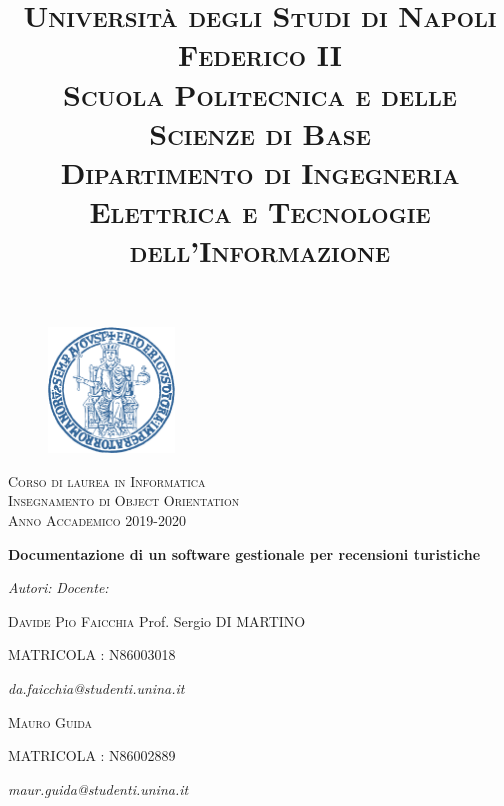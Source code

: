 \documentclass[a4paper,12pt]{article}
\begin{document}
\title { \large \textsc{Università degli Studi di Napoli Federico II \\
		 Scuola Politecnica e delle Scienze di Base} \\
\textsc{Dipartimento di Ingegneria Elettrica e Tecnologie dell’Informazione}}

\author{}
\date{}
\maketitle 
\thispagestyle{empty}

\vspace*{-2cm}
\begin{center}
	\begin{figure}[h]
	\centering
 	\includegraphics[width=0.3\textwidth]{unina_logo.png}
	\end{figure}
	
	\Large \textsc{Corso di laurea in Informatica \\
		   Insegnamento di Object Orientation\\
		   Anno Accademico 2019-2020}
\end{center}

\vspace*{+1.5cm}
\begin{center}
\Huge \bf Documentazione di un software gestionale per recensioni turistiche
\end{center}


\vspace*{-2cm}
\vfill 
\begin{flushleft}
\textit{Autori:} \hfill \textit{Docente:}


\normalsize{\textsc{Davide Pio Faicchia} \hfill \normalsize{Prof. Sergio \textsc{DI MARTINO}}


\textsc{MATRICOLA : N86003018 }


\textit{da.faicchia@studenti.unina.it}}

\end{flushleft}


\begin{flushleft}
\normalsize{\textsc{Mauro Guida}


\textsc{MATRICOLA : N86002889}


\textit{maur.guida@studenti.unina.it}}
\end{flushleft}
\end{document}
